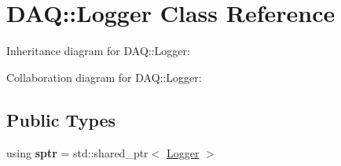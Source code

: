 \hypertarget{classDAQ_1_1Logger}{}\section{D\+AQ\+:\+:Logger Class Reference}
\label{classDAQ_1_1Logger}


Inheritance diagram for D\+AQ\+:\+:Logger\+:


Collaboration diagram for D\+AQ\+:\+:Logger\+:
\subsection*{Public Types}
\begin{DoxyCompactItemize}
\item 
\mbox{\label{classDAQ_1_1Logger_a58c07b0a8c100e506870c41717ff0507}} 
using {\bfseries sptr} = std\+::shared\+\_\+ptr$<$ \hyperlink{classDAQ_1_1Logger}{Logger} $>$
\end{DoxyCompactItemize}
